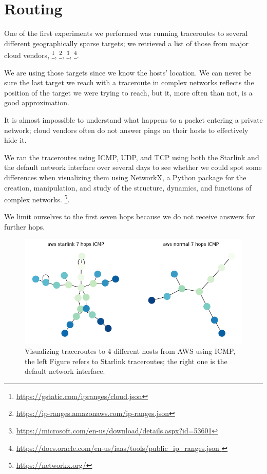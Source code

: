 \documentclass[IN,11pt,twoside,openright,idp,english]{tumthesis}
\begin{document}
\section{Routing}
    
One of the first experiments we performed was running traceroutes to several different geographically sparse targets; we retrieved a list of those from major cloud vendors, \footnote{\url{ https://gstatic.com/ipranges/cloud.json}}, \footnote{\url{https://ip-ranges.amazonaws.com/ip-ranges.json}}, \footnote{\url{https://microsoft.com/en-us/download/details.aspx?id=53601}}, \footnote{\url{https://docs.oracle.com/en-us/iaas/tools/public_ip_ranges.json }}.
    
We are using those targets since we know the hosts' location. We can never be sure the last target we reach with a traceroute in complex networks reflects the position of the target we were trying to reach, but it, more often than not, is a good approximation. 

It is almost impossible to understand what happens to a packet entering a private network; cloud vendors often do not answer pings on their hosts to effectively hide it. 
    
We ran the traceroutes using ICMP, UDP, and TCP using both the Starlink and the default network interface over several days to see whether we could spot some differences when visualizing them using NetworkX, a Python package for the creation, manipulation, and study of the structure, dynamics, and functions of complex networks. \footnote{\url{https://networkx.org/}}. 

We limit ourselves to the first seven hops because we do not receive answers for further hops. 
    
\begin{figure}
    \label{fig:tr_aws_icmp}
    \centering
    \includegraphics[width=0.6\columnwidth]{img/tr_aws_icmp.png}
    \caption{Visualizing traceroutes to 4 different hosts from AWS using ICMP, the left Figure refers to Starlink traceroutes; the right one is the default network interface.}
\end{figure}
    
\end{document}

